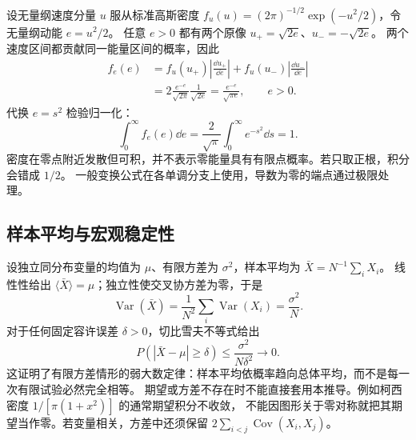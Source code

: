 设无量纲速度分量 $u$ 服从标准高斯密度
$f_u(u)=(2\pi)^{-1/2}\exp(-u^2/2)$，令无量纲动能 $e=u^2/2$。
任意 $e>0$ 都有两个原像 $u_+=\sqrt{2e}$、$u_-=-\sqrt{2e}$。
两个速度区间都贡献同一能量区间的概率，因此
\begin{align*}
 f_e(e)&=f_u(u_+)\left|\frac{\dd u_+}{\dd e}\right|
       +f_u(u_-)\left|\frac{\dd u_-}{\dd e}\right|\\
 &=2\frac{e^{-e}}{\sqrt{2\pi}}\frac1{\sqrt{2e}}
 =\frac{e^{-e}}{\sqrt{\pi e}},\qquad e>0.
\end{align*}
代换 $e=s^2$ 检验归一化：
\[\int_0^\infty f_e(e)\dd e
=\frac2{\sqrt\pi}\int_0^\infty e^{-s^2}\dd s=1.\]
密度在零点附近发散但可积，并不表示零能量具有有限点概率。若只取正根，积分会错成 $1/2$。
一般变换公式在各单调分支上使用，导数为零的端点通过极限处理。

\subsection{样本平均与宏观稳定性}

设独立同分布变量的均值为 $\mu$、有限方差为 $\sigma^2$，样本平均为 $\bar X=N^{-1}\sum_iX_i$。
线性性给出 $\langle\bar X\rangle=\mu$；独立性使交叉协方差为零，于是
\[\operatorname{Var}(\bar X)=\frac1{N^2}\sum_i\operatorname{Var}(X_i)
=\frac{\sigma^2}{N}.\]
对于任何固定容许误差 $\delta>0$，切比雪夫不等式给出
\[P(|\bar X-\mu|\ge\delta)\le\frac{\sigma^2}{N\delta^2}\longrightarrow0.\]
这证明了有限方差情形的弱大数定律：样本平均依概率趋向总体平均，而不是每一次有限试验必然完全相等。
期望或方差不存在时不能直接套用本推导。例如柯西密度 $1/[\pi(1+x^2)]$ 的通常期望积分不收敛，
不能因图形关于零对称就把其期望当作零。若变量相关，方差中还须保留 $2\sum_{i<j}\operatorname{Cov}(X_i,X_j)$。
